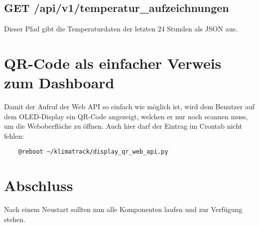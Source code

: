 \documentclass{article}
\begin{document}
\subsection{GET /api/v1/temperatur\_aufzeichnungen}
Dieser Pfad gibt die Temperaturdaten der letzten 24 Stunden als JSON aus.
\section{QR-Code als einfacher Verweis zum Dashboard}
Damit der Aufruf der Web API so einfach wie möglich ist, wird dem Benutzer auf dem OLED-Display ein QR-Code angezeigt, welchen er nur noch scannen muss, um die Weboberfläche zu öffnen. Auch hier darf der Eintrag im Crontab nicht fehlen:
\begin{verbatim}
    @reboot ~/klimatrack/display_qr_web_api.py
\end{verbatim}
\section{Abschluss}
Nach einem Neustart sollten nun alle Komponenten laufen und zur Verfügung stehen.
\end{document}
